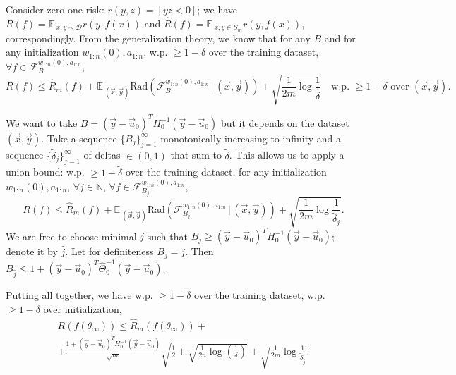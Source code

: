 \documentclass{article}
\newcommand{\EE}{\mathbb{E}\,}
\newcommand{\DD}{\mathcal{D}}
\newcommand{\FF}{\mathcal{F}}
\newcommand{\Rad}[2]{\mathrm{Rad}({#1} \, | \, {#2})}
\begin{document}
    Consider zero-one risk: $r(y,z) = [y z < 0]$; we have $R(f) = \EE_{x,y \sim \DD} r(y,f(x))$ and $\hat R(f) = \EE_{x,y \in S_m} r(y,f(x))$, correspondingly.
    From the generalization theory, we know that for any $B$ and for any initialization $w_{1:n}(0), a_{1:n}$, w.p. $\geq 1-\tilde\delta$ over the training dataset, $\forall f \in \FF_B^{w_{1:n}(0), a_{1:n}}$,
    \begin{equation}
        R(f) \leq
        \hat R_m(f) + \EE_{(\vec x, \vec y)} \Rad{\FF_B^{w_{1:n}(0), a_{1:n}}}{(\vec x, \vec y)} + \sqrt{\frac{1}{2m} \log \frac{1}{\tilde\delta}}
        \quad
        \text{w.p. $\geq 1 - \tilde\delta$ over $(\vec x, \vec y)$.}
    \end{equation}

    We want to take $B = (\vec y - \vec u_0)^T H_0^{-1} (\vec y - \vec u_0)$ but it depends on the dataset $(\vec x, \vec y)$.
    Take a sequence $\{B_j\}_{j=1}^\infty$ monotonically increasing to infinity and a sequence $\{\tilde\delta_j\}_{j=1}^\infty$ of deltas $\in (0,1)$ that sum to $\tilde\delta$.
    This allows us to apply a union bound: w.p. $\geq 1-\tilde\delta$ over the training dataset, for any initialization $w_{1:n}(0), a_{1:n}$, $\forall j \in \mathbb{N}$, $\forall f \in \FF_{B_j}^{w_{1:n}(0), a_{1:n}}$,
    \begin{equation}
        R(f) \leq
        \hat R_m(f) + \EE_{(\vec x, \vec y)} \Rad{\FF_{B_j}^{w_{1:n}(0), a_{1:n}}}{(\vec x, \vec y)} + \sqrt{\frac{1}{2m} \log \frac{1}{\tilde\delta_j}}.
    \end{equation}
    We are free to choose minimal $j$ such that $B_j \geq (\vec y - \vec u_0)^T H_0^{-1} (\vec y - \vec u_0)$; denote it by $\hat j$.
    Let for definiteness $B_j = j$.
    Then $B_{\hat j} \leq 1 + (\vec y - \vec u_0)^T \hat\Theta_0^{-1} (\vec y - \vec u_0)$.
    
    Putting all together, we have w.p. $\geq 1-\tilde\delta$ over the training dataset, w.p. $\geq 1-\delta$ over initialization,
    \begin{multline}
        R(f(\theta_\infty)) \leq
        \hat R_m(f(\theta_\infty)) + 
        \\+
        \frac{1 + (\vec y - \vec u_0)^T H_0^{-1} (\vec y - \vec u_0)}{\sqrt{m}} \sqrt{\frac{1}{2} + \sqrt{\frac{1}{2n} \log\left(\frac{1}{\delta}\right)}} + \sqrt{\frac{1}{2m} \log \frac{1}{\tilde\delta_{\hat j}}}.
        \label{eq:generalization_bound_for_fixed_acts_model}
    \end{multline}
\end{document}
